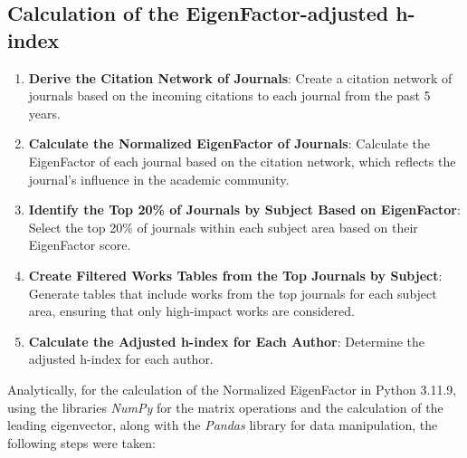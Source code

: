 \subsection{Calculation of the EigenFactor-adjusted h-index}
\begin{enumerate}
      \item \textbf{Derive the Citation Network of Journals}: Create a citation network of journals based on the
            incoming citations to each journal from the past 5 years.
      \item \textbf{Calculate the Normalized EigenFactor of Journals}: Calculate the EigenFactor of each journal based on the
            citation network, which reflects the journal's influence in the academic community.
      \item \textbf{Identify the Top 20\% of Journals by Subject Based on EigenFactor}: Select the top 20\% of journals within
            each subject area based on their EigenFactor score\@.

      \item \textbf{Create Filtered Works Tables from the Top Journals by Subject}: Generate tables that include works from
            the top journals for each subject area, ensuring that only high-impact works are considered.


      \item \textbf{Calculate the Adjusted h-index for Each Author}: Determine the adjusted h-index for each author.
\end{enumerate}

Analytically, for the calculation of the Normalized EigenFactor in Python
3.11.9, using the libraries \emph{NumPy} for the matrix
operations and the calculation of the leading eigenvector, along with the
\emph{Pandas} library for data manipulation, the following steps were taken:

